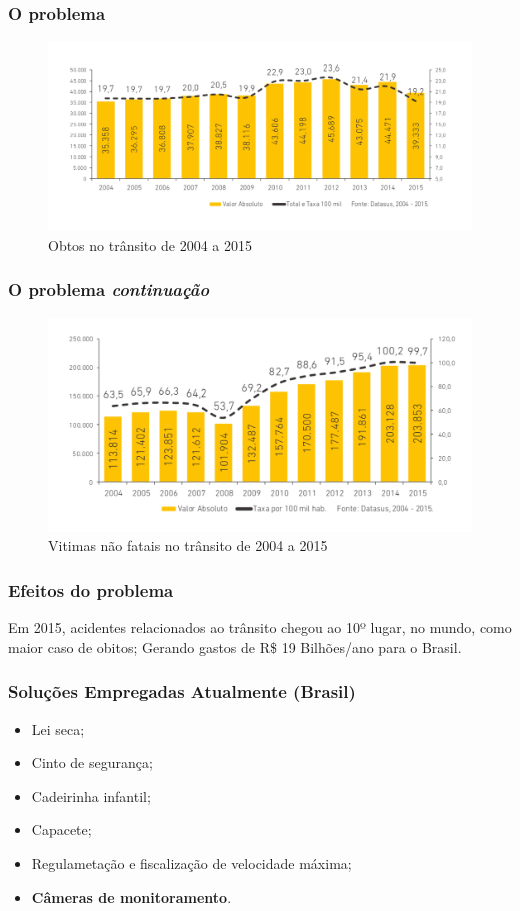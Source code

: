 \begin{frame}
	\frametitle{O problema}
\begin{figure}[h]
	\caption{Obtos no trânsito de 2004 a 2015}
	\centering
	\includegraphics[width=1\textwidth]{imagens/obto}
	\end{figure}
\end{frame}

\begin{frame}
	\frametitle{O problema \textit{continuação}}
\begin{figure}[h]
	\caption{Vitimas não fatais no trânsito de 2004 a 2015}
	\centering
	\includegraphics[width=1\textwidth]{imagens/ferido}
	\end{figure}
\end{frame}

\begin{frame}
	\frametitle{Efeitos do problema}
	Em 2015, acidentes relacionados ao trânsito chegou ao 
	10º lugar, no mundo, como maior caso de obitos;
	Gerando gastos de R\$ 19 Bilhões/ano para o Brasil\cite{ambev}.
\end{frame}

\begin{frame}
	\frametitle{Soluções Empregadas Atualmente (Brasil)}
	\begin{itemize}[<+->]
		\item Lei seca;
		\item Cinto de segurança;
		\item Cadeirinha infantil;
		\item Capacete;
		\item Regulametação e fiscalização de velocidade máxima;
		\item \textbf{Câmeras de monitoramento}.
 	\end{itemize}
\end{frame}